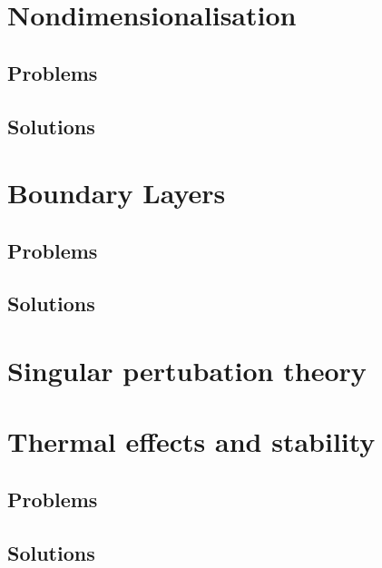   \chapter{Nondimensionalisation}
      
      
      \section{Problems}
         
      \section{Solutions}
         \shipoutAnswer

   \chapter{Boundary Layers}
      
      
      
      
      \section{Problems}
         
         
      \section{Solutions}
         \shipoutAnswer

   \chapter{Singular pertubation theory}
      
      

   \chapter{Thermal effects and stability}
      
      
      \section{Problems}
         
      \section{Solutions}
         \shipoutAnswer

   
